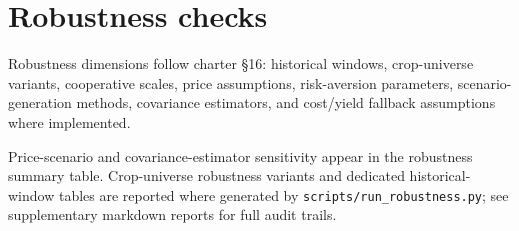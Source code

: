 \section{Robustness checks}
\label{sec:robustness}

Robustness dimensions follow charter \S16: historical windows, crop-universe variants,
cooperative scales, price assumptions, risk-aversion parameters, scenario-generation methods,
covariance estimators, and cost/yield fallback assumptions where implemented.


Price-scenario and covariance-estimator sensitivity appear in the robustness summary table.
Crop-universe robustness variants and dedicated historical-window tables are reported where
generated by \texttt{scripts/run\_robustness.py}; see supplementary markdown reports for
full audit trails.
